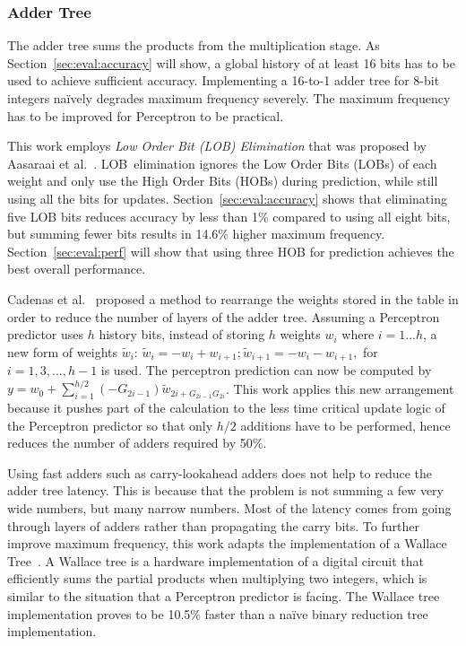 \documentclass[conference]{IEEEtran}
\begin{document}
\subsubsection{Adder Tree}
\label{sec:fpga:perceptron:adder}
The adder tree sums the products from the multiplication stage. As Section~\ref{sec:eval:accuracy} will show, a global history of at least 16 bits has to be used to achieve sufficient accuracy. Implementing a 16-to-1 adder tree for 8-bit integers na\"ively degrades maximum frequency severely. The maximum frequency has to be improved for Perceptron to be practical.

This work employs \textit{Low Order Bit (LOB) Elimination} that was proposed by Aasaraai et al.~\cite{lob}. LOB\ elimination ignores the Low Order Bits (LOBs) of each weight and only use the High Order Bits (HOBs) during prediction, while still using all the bits for updates. Section~\ref{sec:eval:accuracy} shows that eliminating five LOB bits reduces accuracy by less than 1\% compared to using all eight bits, but summing fewer bits results in 14.6\% higher maximum frequency. Section~\ref{sec:eval:perf} will show that using three HOB for prediction achieves the best overall performance.

Cadenas et al.~\cite{perceptronRearrange} proposed a method to rearrange the weights stored in the table in order to reduce the number of layers of the adder tree. Assuming a Perceptron predictor uses $h$ history bits, instead of storing $h$ weights $w_i$ where $i = 1 ... h$, a new form of weights $\widetilde{w}_i$: $\widetilde{w}_i = - w_i + w_{i+1}; \widetilde{w}_{i+1} = - w_i - w_{i+1},$ for $i = 1, 3, ..., h-1$ is used. The perceptron prediction can now be computed by $y = w_0 + \sum_{i=1}^{h/2}(-G_{2i-1})\widetilde{w}_{2i+G_{2i-1}G_{2i}}$. This work applies this new arrangement because it pushes part of the calculation to the less time critical update logic of the Perceptron predictor so that only $h/2$ additions have to be performed, hence reduces the number of adders required by 50\%.

Using fast adders such as carry-lookahead adders does not help to reduce the adder tree latency. This is because that the problem is not summing a few very wide numbers, but many narrow numbers. Most of the latency comes from going through layers of adders rather than propagating the carry bits. To further improve maximum frequency, this work adapts the implementation of a Wallace Tree~\cite{wallacetree}. A Wallace tree is a hardware implementation of a digital circuit that efficiently sums the partial products when multiplying two integers, which is similar to the situation that a Perceptron predictor is facing. The Wallace tree implementation proves to be 10.5\% faster than a na\"ive binary reduction tree implementation. 
\end{document}
